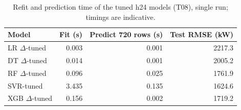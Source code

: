 \begin{table}[H]\centering\small
\caption{Refit and prediction time of the tuned h24 models (T08), single run; timings are indicative.}\label{tab:runtime}
\setlength{\tabcolsep}{4pt}
\begin{tabular}{lrrr}
\toprule
Model & Fit (s) & Predict 720 rows (s) & Test RMSE (kW) \\
\midrule
LR $\Delta$-tuned & \num{0.003} & \num{0.001} & \num{2217.3} \\
DT $\Delta$-tuned & \num{0.014} & \num{0.001} & \num{2005.2} \\
RF $\Delta$-tuned & \num{0.096} & \num{0.025} & \num{1761.9} \\
SVR-tuned & \num{3.435} & \num{0.135} & \num{1624.6} \\
XGB $\Delta$-tuned & \num{0.156} & \num{0.002} & \num{1719.2} \\
\bottomrule\end{tabular}
\end{table}

